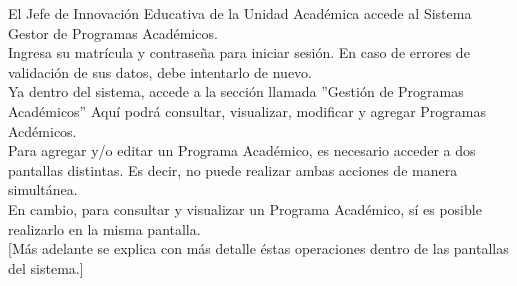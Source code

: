         El Jefe de Innovación Educativa de la Unidad Académica accede al Sistema Gestor de Programas Académicos.\\
        
        Ingresa su matrícula y contraseña para iniciar sesión. En caso de errores de validación de sus datos, debe intentarlo de nuevo.\\
        
        Ya dentro del sistema, accede a la sección llamada ''Gestión de Programas Académicos'' Aquí podrá consultar, visualizar, modificar y agregar Programas Acdémicos. \\
        
        Para agregar y/o editar un Programa Académico, es necesario acceder a dos pantallas distintas. Es decir, no puede realizar ambas acciones de manera simultánea.\\
        
        En cambio, para consultar y visualizar  un Programa Académico, sí es posible realizarlo en la misma pantalla.\\
        
        [Más adelante se explica con más detalle éstas operaciones dentro de las pantallas del sistema.]\\
        
        

